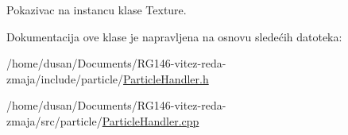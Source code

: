 Pokazivac na instancu klase Texture. 



Dokumentacija ove klase je napravljena na osnovu sledećih datoteka\+:\begin{DoxyCompactItemize}
\item 
/home/dusan/\+Documents/\+R\+G146-\/vitez-\/reda-\/zmaja/include/particle/\hyperlink{ParticleHandler_8h}{Particle\+Handler.\+h}\item 
/home/dusan/\+Documents/\+R\+G146-\/vitez-\/reda-\/zmaja/src/particle/\hyperlink{ParticleHandler_8cpp}{Particle\+Handler.\+cpp}\end{DoxyCompactItemize}

